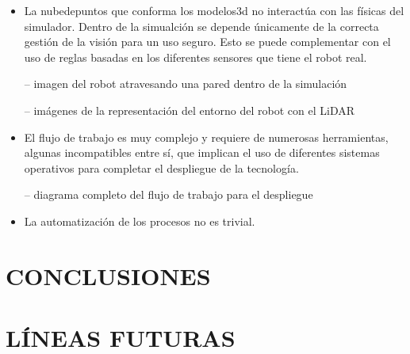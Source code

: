 \documentclass[a4paper, 12pt, spanish, twoside]{article}
\begin{document}
\begin{itemize} 

\item La \gls{nubedepuntos} que conforma los \gls{modelos3d} no interactúa con las físicas del simulador. Dentro de la simualción se depende únicamente de la correcta gestión de la visión para un uso seguro. Esto se puede complementar con el uso de reglas basadas en los diferentes sensores que tiene el robot real.  

-- imagen del robot atravesando una pared dentro de la simulación  

-- imágenes de la representación del entorno del robot con el LiDAR 

\item El flujo de trabajo es muy complejo y requiere de numerosas herramientas, algunas incompatibles entre sí, que implican el uso de diferentes sistemas operativos para completar el despliegue de la tecnología. 

-- diagrama completo del flujo de trabajo para el despliegue 

\item La automatización de los procesos no es trivial. 

\end{itemize} 

\clearpage





\newpage
\section{CONCLUSIONES} \label{sec:conclusiones}

\clearpage





\newpage
\section{LÍNEAS FUTURAS} \label{sec:lineas_futuras}
\end{document}
